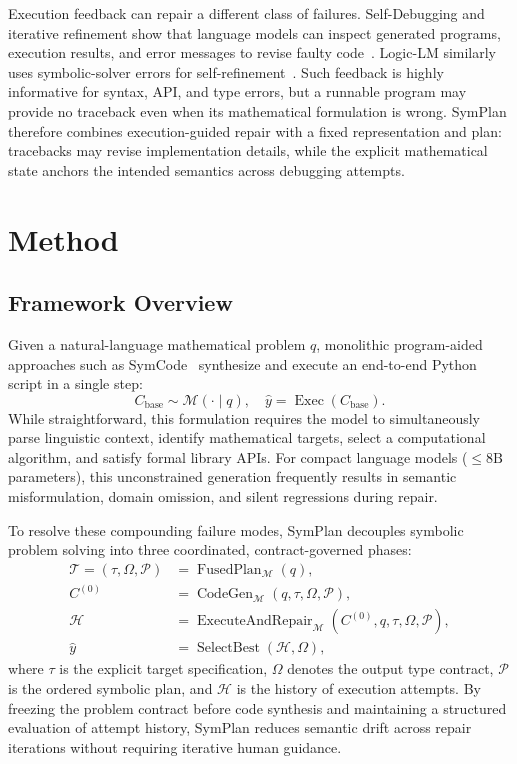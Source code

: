 \documentclass[conference,a4paper]{IEEEtran}
\begin{document}
Execution feedback can repair a different class of failures. Self-Debugging and iterative refinement show that language models can inspect generated programs, execution results, and error messages to revise faulty code~\cite{chen2024selfdebug,madaan2023selfrefine}. Logic-LM similarly uses symbolic-solver errors for self-refinement~\cite{pan2023logiclm}. Such feedback is highly informative for syntax, API, and type errors, but a runnable program may provide no traceback even when its mathematical formulation is wrong. SymPlan therefore combines execution-guided repair with a fixed representation and plan: tracebacks may revise implementation details, while the explicit mathematical state anchors the intended semantics across debugging attempts.

\section{Method}
\label{sec:method}

\subsection{Framework Overview}

Given a natural-language mathematical problem $q$, monolithic program-aided approaches such as SymCode~\cite{nezhad2025symcode} synthesize and execute an end-to-end Python script in a single step:
\begin{equation}
C_{\text{base}} \sim \mathcal{M}(\cdot \mid q), \quad \hat{y} = \operatorname{Exec}(C_{\text{base}}).
\end{equation}
While straightforward, this formulation requires the model to simultaneously parse linguistic context, identify mathematical targets, select a computational algorithm, and satisfy formal library APIs. For compact language models ($\le 8\text{B}$ parameters), this unconstrained generation frequently results in semantic misformulation, domain omission, and silent regressions during repair.

To resolve these compounding failure modes, SymPlan decouples symbolic problem solving into three coordinated, contract-governed phases:
\begin{align}
\mathcal{T} = (\tau, \Omega, \mathcal{P}) &= \operatorname{FusedPlan}_{\mathcal{M}}(q), \label{eq:fused_plan} \\
C^{(0)} &= \operatorname{CodeGen}_{\mathcal{M}}(q, \tau, \Omega, \mathcal{P}), \label{eq:codegen} \\
\mathcal{H} &= \operatorname{ExecuteAndRepair}_{\mathcal{M}}(C^{(0)}, q, \tau, \Omega, \mathcal{P}), \label{eq:repair} \\
\hat{y} &= \operatorname{SelectBest}(\mathcal{H}, \Omega), \label{eq:select}
\end{align}
where $\tau$ is the explicit target specification, $\Omega$ denotes the output type contract, $\mathcal{P}$ is the ordered symbolic plan, and $\mathcal{H}$ is the history of execution attempts. By freezing the problem contract before code synthesis and maintaining a structured evaluation of attempt history, SymPlan reduces semantic drift across repair iterations without requiring iterative human guidance.
\end{document}

